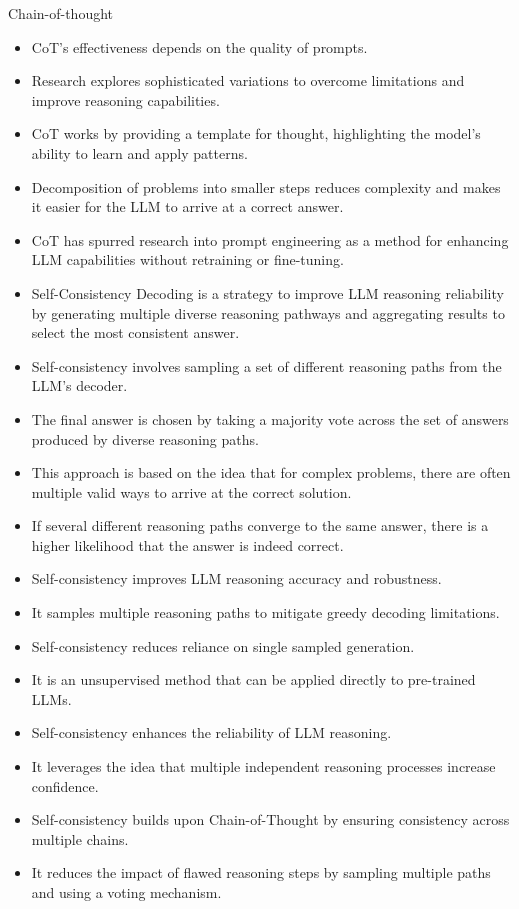 \begin{frame}[allowframebreaks]{Chain-of-thought}
\begin{itemize}
	\item CoT’s effectiveness depends on the quality of prompts.
	\item Research explores sophisticated variations to overcome limitations and improve reasoning capabilities.
	\item CoT works by providing a template for thought, highlighting the model’s ability to learn and apply patterns.
	\item Decomposition of problems into smaller steps reduces complexity and makes it easier for the LLM to arrive at a correct answer.
	\item CoT has spurred research into prompt engineering as a method for enhancing LLM capabilities without retraining or fine-tuning.
	\item Self-Consistency Decoding is a strategy to improve LLM reasoning reliability by generating multiple diverse reasoning pathways and aggregating results to select the most consistent answer.
	\item Self-consistency involves sampling a set of different reasoning paths from the LLM’s decoder.
	\item The final answer is chosen by taking a majority vote across the set of answers produced by diverse reasoning paths.
	\item This approach is based on the idea that for complex problems, there are often multiple valid ways to arrive at the correct solution.
	\item If several different reasoning paths converge to the same answer, there is a higher likelihood that the answer is indeed correct.
	\item Self-consistency improves LLM reasoning accuracy and robustness.
	\item It samples multiple reasoning paths to mitigate greedy decoding limitations.
	\item Self-consistency reduces reliance on single sampled generation.
	\item It is an unsupervised method that can be applied directly to pre-trained LLMs.
	\item Self-consistency enhances the reliability of LLM reasoning.
	\item It leverages the idea that multiple independent reasoning processes increase confidence.
	\item Self-consistency builds upon Chain-of-Thought by ensuring consistency across multiple chains.
	\item It reduces the impact of flawed reasoning steps by sampling multiple paths and using a voting mechanism.

\end{itemize}
\end{frame}
